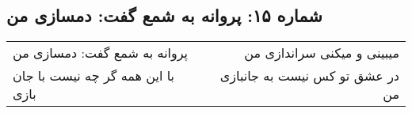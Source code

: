 \begin{center}
\section*{شماره ۱۵: پروانه به شمع گفت: دمسازی من}
\label{sec:015}
\begin{longtable}{l p{0.5cm} r}
پروانه به شمع گفت: دمسازی من
&&
میبینی و میکنی سراندازی من
\\
با این همه گر چه نیست با جان بازی
&&
در عشق تو کس نیست به جانبازی من
\\
\end{longtable}
\end{center}
